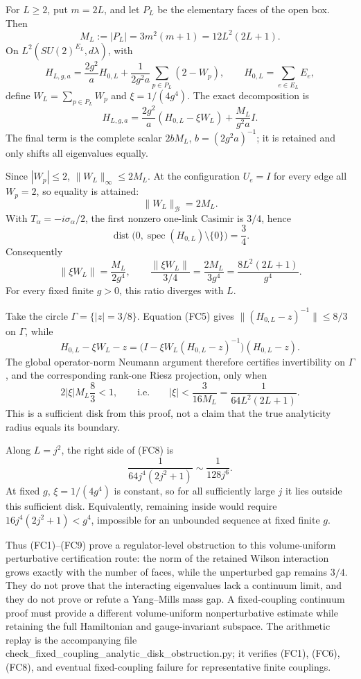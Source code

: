 \documentclass[
  11pt,
]{article}
\begin{document}
For \(L\ge2\), put \(m=2L\), and let \(P_L\) be the elementary faces of
the open box. Then \[
 M_L:=|P_L|=3m^2(m+1)=12L^2(2L+1). \tag{FC1}
\] On \(L^2(SU(2)^{E_L},d\lambda)\), with \[
 H_{L,g,a}=\frac{2g^2}{a}H_{0,L}
 +\frac{1}{2g^2a}\sum_{p\in P_L}(2-W_p),\qquad
 H_{0,L}=\sum_{e\in E_L}E_e, \tag{FC2}
\] define \(W_L=\sum_{p\in P_L}W_p\) and \(\xi=1/(4g^4)\). The exact
decomposition is \[
 H_{L,g,a}=\frac{2g^2}{a}(H_{0,L}-\xi W_L)
 +\frac{M_L}{g^2a}I. \tag{FC3}
\] The final term is the complete scalar \(2bM_L\), \(b=(2g^2a)^{-1}\);
it is retained and only shifts all eigenvalues equally.

Since \(|W_p|\le2\), \(\|W_L\|_\infty\le2M_L\). At the configuration
\(U_e=I\) for every edge all \(W_p=2\), so equality is attained: \[
 \|W_L\|_{\mathcal B}=2M_L. \tag{FC4}
\] With \(T_\alpha=-i\sigma_\alpha/2\), the first nonzero one-link
Casimir is \(3/4\), hence \[
 \operatorname{dist}\bigl(0,\operatorname{spec}(H_{0,L})\setminus\{0\}\bigr)
 =\frac34. \tag{FC5}
\] Consequently \[
 \|\xi W_L\|=\frac{M_L}{2g^4},\qquad
 \frac{\|\xi W_L\|}{3/4}
 =\frac{2M_L}{3g^4}
 =\frac{8L^2(2L+1)}{g^4}. \tag{FC6}
\] For every fixed finite \(g>0\), this ratio diverges with \(L\).

Take the circle \(\Gamma=\{|z|=3/8\}\). Equation (FC5) gives
\(\|(H_{0,L}-z)^{-1}\|\le8/3\) on \(\Gamma\), while \[
 H_{0,L}-\xi W_L-z
 =\bigl(I-\xi W_L(H_{0,L}-z)^{-1}\bigr)(H_{0,L}-z). \tag{FC7}
\] The global operator-norm Neumann argument therefore certifies
invertibility on \(\Gamma\), and the corresponding rank-one Riesz
projection, only when \[
 2|\xi|M_L\frac83<1,\qquad\text{i.e.}\qquad
 \boxed{|\xi|<\frac{3}{16M_L}
 =\frac{1}{64L^2(2L+1)}.} \tag{FC8}
\] This is a sufficient disk from this proof, not a claim that the true
analyticity radius equals its boundary.

Along \(L=j^2\), the right side of (FC8) is \[
 \frac{1}{64j^4(2j^2+1)}\sim\frac{1}{128j^6}. \tag{FC9}
\] At fixed \(g\), \(\xi=1/(4g^4)\) is constant, so for all sufficiently
large \(j\) it lies outside this sufficient disk. Equivalently,
remaining inside would require \(16j^4(2j^2+1)<g^4\), impossible for an
unbounded sequence at fixed finite \(g\).

Thus (FC1)--(FC9) prove a regulator-level obstruction to this
volume-uniform perturbative certification route: the norm of the
retained Wilson interaction grows exactly with the number of faces,
while the unperturbed gap remains \(3/4\). They do not prove that the
interacting eigenvalues lack a continuum limit, and they do not prove or
refute a Yang--Mills mass gap. A fixed-coupling continuum proof must
provide a different volume-uniform nonperturbative estimate while
retaining the full Hamiltonian and gauge-invariant subspace. The
arithmetic replay is the accompanying file
check\_fixed\_coupling\_analytic\_disk\_obstruction.py; it verifies
(FC1), (FC6), (FC8), and eventual fixed-coupling failure for
representative finite couplings.
\end{document}
